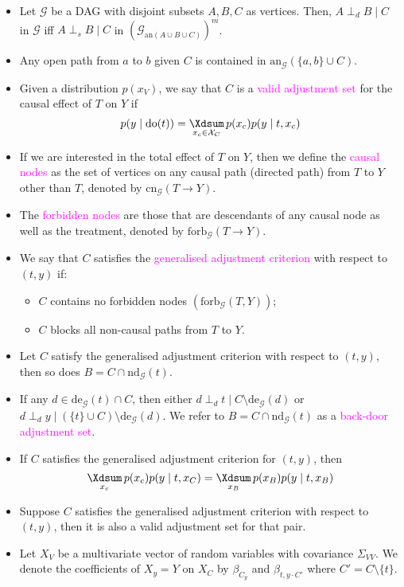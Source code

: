 \documentclass[UTF8]{book}
\DeclareMathOperator*{\Xsum}{\mathchoice{\Xdsum}{\Xtsum}{\Xtsum}{\Xtsum}}
\newcommand{\concept}[1]{\textcolor{magenta}{#1}}
\begin{document}
\begin{itemize}
\item Let $\mathcal{G}$ be a DAG with disjoint subsets $A,B,C$ as vertices. Then, $A\perp_d B\mid C$ in $\mathcal{G}$ iff $A\perp_s B\mid C$ in $(\mathcal{G}_{\mathrm{an}(A\cup B\cup C)})^m$.
\item Any open path from $a$ to $b$ given $C$ is contained in $\mathrm{an}_\mathcal{G}(\{a,b\}\cup C)$.
\item Given a distribution $p(x_V)$, we say that $C$ is a \concept{valid adjustment set} for the causal effect of $T$ on $Y$ if
$$
p(y\mid \mathrm{do}(t)) = \Xsum_{x_c\in \mathcal{X}_C} p(x_c)p(y\mid t, x_c)
$$
\item If we are interested in the total effect of $T$ on $Y$, then we define the \concept{causal nodes} as the set of vertices on any causal path (directed path) from $T$ to $Y$ other than $T$, denoted by $\mathrm{cn}_\mathcal{G}(T\rightarrow Y)$.
\item The \concept{forbidden nodes} are those that are descendants of any causal node as well as the treatment, denoted by $\mathrm{forb}_\mathcal{G}(T\rightarrow Y)$.
\item We say that $C$ satisfies the \concept{generalised adjustment criterion} with respect to $(t,y)$ if:
\begin{itemize}
	\item $C$ contains no forbidden nodes $(\mathrm{forb}_\mathcal{G}(T,Y))$;
	\item $C$ blocks all non-causal paths from $T$ to $Y$.
\end{itemize}
\item Let $C$ satisfy the generalised adjustment criterion with respect to $(t,y)$, then so does $B = C\cap \mathrm{nd}_\mathcal{G}(t)$.
\item If any $d\in\mathrm{de}_\mathcal{G}(t)\cap C$, then either $d\perp_d t\mid C\setminus\mathrm{de}_\mathcal{G}(d)$ or $d\perp_d y\mid (\{t\}\cup C)\setminus \mathrm{de}_\mathcal{G}(d)$. We refer to $B = C\cap \mathrm{nd}_\mathcal{G}(t)$ as a \concept{back-door adjustment set}.
\item If $C$ satisfies the generalised adjustment criterion for $(t,y)$, then
$$
\Xsum_{x_c}p(x_c)p(y\mid t, x_C) = \Xsum_{x_B}p(x_B)p(y\mid t, x_B)
$$
\item Suppose $C$ satisfies the generalised adjustment criterion with respect to $(t,y)$, then it is also a valid adjustment set for that pair.
\item Let $X_V$ be a multivariate vector of random variables with covariance $\Sigma_{VV}$. We denote the coefficients of $X_y = Y$ on $X_C$ by $\beta_{C_y}$ and $\beta_{t,y\cdot C'}$ where $C' = C\setminus\{t\}$.

\end{itemize}
\end{document}
